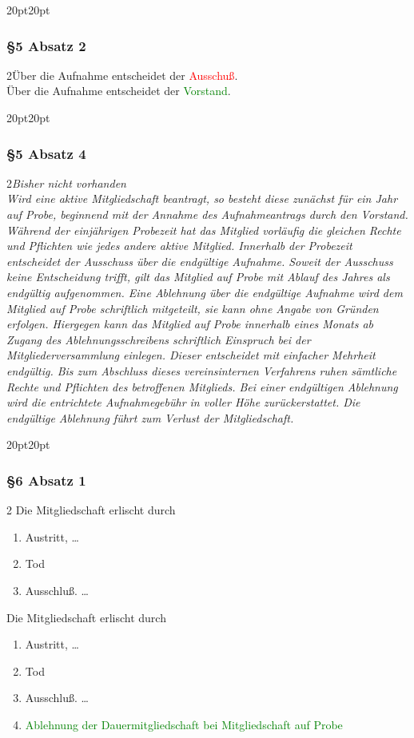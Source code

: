 \documentclass[10pt,a4paper,parskip=half]{scrartcl}
\newcommand{\new}[1]{\textcolor{Green}{#1}}
\newcommand{\old}[1]{\textcolor{Red}{#1}}
\newcommand{\change}[1]{
  \begin{adjustwidth}{20pt}{20pt}
    #1
  \end{adjustwidth}
}
\newcommand{\compare}[3]{\change{\subsubsection*{#1}\begin{multicols}{2}#2\columnbreak\\#3\end{multicols}}}
\begin{document}
    \compare{§5 Absatz 2}{Über die Aufnahme entscheidet der \old{Ausschuß}.}{Über die Aufnahme entscheidet der \new{Vorstand}.}
    \clearpage
    \compare{§5 Absatz 4}{\em Bisher nicht vorhanden \em}{Wird eine aktive Mitgliedschaft beantragt,
    so besteht diese zunächst für ein Jahr auf Probe,
    beginnend mit der Annahme des Aufnahmeantrags durch den Vorstand.
    Während der einjährigen Probezeit hat das Mitglied vorläufig die gleichen Rechte und Pflichten wie jedes andere aktive Mitglied.
    Innerhalb der Probezeit entscheidet der Ausschuss über die endgültige Aufnahme.
    Soweit der Ausschuss keine Entscheidung trifft,
    gilt das Mitglied auf Probe mit Ablauf des Jahres als endgültig aufgenommen.
    Eine Ablehnung über die endgültige Aufnahme wird dem Mitglied auf Probe schriftlich mitgeteilt,
    sie kann ohne Angabe von Gründen erfolgen.
    Hiergegen kann das Mitglied auf Probe innerhalb eines Monats ab Zugang des Ablehnungsschreibens schriftlich Einspruch bei der Mitgliederversammlung einlegen.
    Dieser entscheidet mit einfacher Mehrheit endgültig.
    Bis zum Abschluss dieses vereinsinternen Verfahrens ruhen sämtliche Rechte und Pflichten des betroffenen Mitglieds.
    Bei einer endgültigen Ablehnung wird die entrichtete Aufnahmegebühr in voller Höhe zurückerstattet.
    Die endgültige Ablehnung führt zum Verlust der Mitgliedschaft.}

    \change{
    \subsubsection*{§6 Absatz 1}
    \begin{multicols}{2}
    Die Mitgliedschaft erlischt durch
    \begin{enumerate}[label=\alph*)]
      \item Austritt, \dots
      \item Tod
      \item{Ausschluß.} \dots
    \end{enumerate}
    \columnbreak
    Die Mitgliedschaft erlischt durch
    \begin{enumerate}[label=\alph*)]
      \item Austritt, \dots
      \item Tod
      \item{Ausschluß.} \dots
      \item \new{Ablehnung der Dauermitgliedschaft bei Mitgliedschaft auf Probe}
    \end{enumerate}
  \end{multicols}
  }
\end{document}
